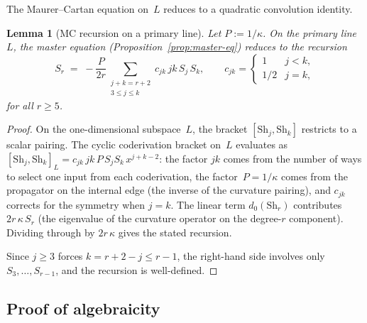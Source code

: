 \documentclass[11pt]{article}
\theoremstyle{plain}
\newtheorem{lemma}[theorem]{Lemma}
\theoremstyle{definition}
\theoremstyle{remark}
\newcommand{\Sh}{\mathrm{Sh}}
\begin{document}
The Maurer--Cartan equation on~$L$ reduces to a quadratic
convolution identity.

\begin{lemma}[MC recursion on a primary line]
\label{lem:mc-recursion}
Let $P := 1/\kappa$. On the primary line~$L$, the master
equation \textup{(}Proposition~\textup{\ref{prop:master-eq})}
reduces to the recursion
\begin{equation}\label{eq:recursion}
 S_r
 \;=\;
 -\frac{P}{2r}
 \sum_{\substack{j + k = r + 2 \\ 3 \leq j \leq k}}
 c_{jk}\,jk\,S_j\,S_k,
 \qquad
 c_{jk} = \begin{cases} 1 & j < k, \\ 1/2 & j = k,\end{cases}
\end{equation}
for all $r \geq 5$.
\end{lemma}

\begin{proof}
On the one-dimensional subspace~$L$, the bracket
$[\Sh_j, \Sh_k]$ restricts to a scalar pairing.
The cyclic coderivation bracket on~$L$ evaluates as
$[\Sh_j, \Sh_k]_L = c_{jk}\,jk\,P\,S_j S_k\,x^{j+k-2}$:
the factor $jk$ comes from the number of ways to select
one input from each coderivation, the factor~$P = 1/\kappa$
comes from the propagator on the internal edge
(the inverse of the curvature pairing), and $c_{jk}$
corrects for the symmetry when $j = k$.
The linear term $d_0(\Sh_r)$ contributes $2r\,\kappa\,S_r$
(the eigenvalue of the curvature operator on the degree-$r$
component). Dividing through by $2r\,\kappa$ gives the
stated recursion.

Since $j \geq 3$ forces $k = r + 2 - j \leq r - 1$,
the right-hand side involves only $S_3, \ldots, S_{r-1}$,
and the recursion is well-defined.
\end{proof}


\subsection{Proof of algebraicity}
\end{document}
